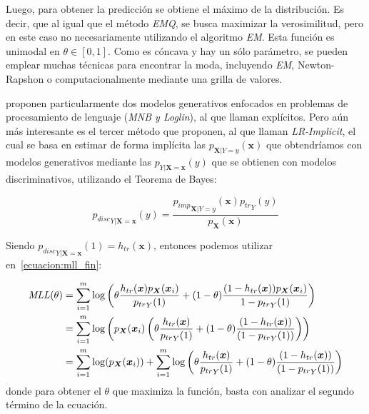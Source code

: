 Luego, para obtener la predicción se obtiene el máximo de la distribución. Es
decir, que al igual que el método {\it EMQ}, se busca maximizar la
verosimilitud, pero en este caso no necesariamente utilizando el algoritmo {\it
EM}. Esta función es unimodal en \(\theta \in [0,1]\). Como es cóncava y hay un
sólo parámetro, se pueden emplear muchas técnicas para encontrar la moda,
incluyendo {\it EM}, Newton-Rapshon o computacionalmente mediante una grilla de
valores.

\citet{keith2018uncertainty} proponen particularmente dos modelos generativos
enfocados en problemas de procesamiento de lenguaje ({\it MNB\/ y \it
Loglin\/}), al que llaman explícitos. Pero aún más interesante es el tercer
método que proponen, al que llaman {\it LR-Implicit}, el cual se basa en estimar
de forma implícita las \(p_{\boldsymbol{X}|Y=y}(\boldsymbol{x})\) que
obtendríamos con modelos generativos mediante las
\(p_{Y|\boldsymbol{X}=\boldsymbol{x}}(y)\) que se obtienen con modelos
discriminativos, utilizando el Teorema de Bayes:

\begin{equation}\label{ecuacion:disc_gen}
    {p_{disc}}_{Y|\boldsymbol{X}=\boldsymbol{x}}(y) = \frac{{p_{imp}}_{\boldsymbol{X}|Y=y}(\boldsymbol{x}){p_{tr}}_Y(y)}{p_{\boldsymbol{X}}(\boldsymbol{x})}
\end{equation}

Siendo
\({p_{disc}}_{Y|\boldsymbol{X}=\boldsymbol{x}}(1)=h_{tr}(\boldsymbol{x})\),
entonces podemos utilizar en~\ref{ecuacion:mll_fin}:

\begin{align}\label{ecuacion:disc_gen_2}
\begin{split}
    {\it MLL\/}(\theta) &= \sum \limits_{i=1}^{m} {\log \left( {{\theta} \frac{h_{tr}(\boldsymbol{x}) p_{\boldsymbol{X}}(\boldsymbol{x}_i)}{{p_{tr}}_Y(1)} + (1- \theta) \frac{(1 - h_{tr}(\boldsymbol{x})) p_{\boldsymbol{X}}(\boldsymbol{x}_i)}{{1 - p_{tr}}_Y(1)}} \right)} \\
    &= \sum \limits_{i=1}^{m} {\log \left( p_{\boldsymbol{X}}(\boldsymbol{x}_i) \left( \theta \frac{h_{tr}(\boldsymbol{x})}{{p_{tr}}_Y(1)} + (1- \theta) \frac{(1 - h_{tr}(\boldsymbol{x}))}{({1 - p_{tr}}_Y(1))} \right) \right)} \\
    &= \sum \limits_{i=1}^{m} {\log (p_{\boldsymbol{X}}(\boldsymbol{x}_i))} + \sum \limits_{i=1}^{m} {\log \left( \theta \frac{h_{tr}(\boldsymbol{x})}{{p_{tr}}_Y(1)} + (1- \theta) \frac{(1 - h_{tr}(\boldsymbol{x}))}{({1 - p_{tr}}_Y(1))} \right)} \\
\end{split}
\end{align}
donde para obtener el \(\theta\) que maximiza la función, basta con analizar el
segundo término de la ecuación.


